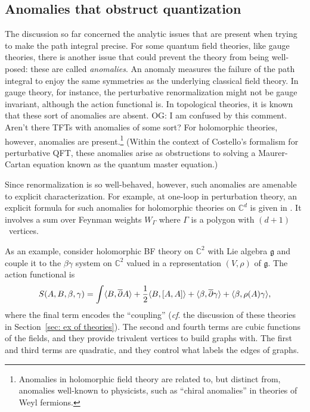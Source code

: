 \documentclass[11pt]{amsart}
\def\C{{\mathbb{C}}}
\def\lie#1{\ensuremath{\mathfrak{#1}}}
\def\owen#1{{\textcolor{violet!50!black}{OG: {#1}}}}
\begin{document}
\subsection{Anomalies that obstruct quantization}

The discussion so far concerned the analytic issues that are present when trying to make the path integral precise.
For some quantum field theories, like gauge theories, there is another issue that could prevent the theory from being well-posed:
these are called {\em anomalies}.
An anomaly measures the failure of the path integral to enjoy the same symmetries as the underlying classical field theory.
In gauge theory, for instance, the perturbative renormalization might not be gauge invariant, although the action functional is.
In topological theories, it is known that these sort of anomalies are absent.
\owen{I am confused by this comment. Aren't there TFTs with anomalies of some sort?}
For holomorphic theories, however, anomalies are present.\footnote{Anomalies in holomorphic field theory are related to, but distinct from, anomalies well-known to physicists, such as ``chiral anomalies'' in theories of Weyl fermions.}
(Within the context of Costello's formalism for perturbative QFT,
these anomalies arise as obstructions to solving a Maurer-Cartan equation known as the quantum master equation.)

Since renormalization is so well-behaved, however, such anomalies are amenable to explicit characterization.
For example, at one-loop in perturbation theory, an explicit formula for such anomalies for holomorphic theories on $\C^d$ is given in \cite{Whol}.
It involves a sum over Feynman weights $W_\Gamma$ where $\Gamma$ is a polygon with $(d+1)$~vertices.

As an example, consider holomorphic BF theory on $\C^2$ with Lie algebra $\lie{g}$
and couple it to the $\beta\gamma$ system on $\C^2$ valued in a representation $(V, \rho)$ of $\lie{g}$.
The action functional is
\[
S(A,B, \beta, \gamma) = \int \langle B, {\overline{\partial}} A\rangle + \frac{1}{2} \langle B, [A,A]\rangle + \langle \beta, {\overline{\partial}} \gamma\rangle + \langle \beta, \rho(A)\gamma\rangle,
\]
where the final term encodes the ``coupling'' ({\it cf}. the discussion of these theories in Section~\ref{sec: ex of theories}).
The second and fourth terms are cubic functions of the fields,
and they provide trivalent vertices to build graphs with.
The first and third terms are quadratic, and they control what labels the edges of graphs.
\end{document}

